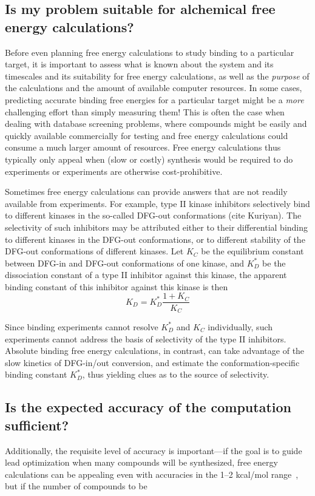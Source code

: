 \documentclass[9pt,bestpractices]{livecoms}
\begin{document}
\subsection*{Is my problem suitable for alchemical free energy calculations?}
Before even planning free energy calculations to study binding to a
particular target, it is important to assess what is known about the
system and its timescales and its suitability for free energy
calculations, as well as the \emph{purpose} of the calculations and
the amount of available computer resources. In some cases, predicting
accurate binding free energies for a particular target might be a
\emph{more} challenging effort than simply measuring them! This is
often the case when dealing with database screening problems, where
compounds might be easily and quickly available commercially for
testing and free energy calculations could consume a much larger
amount of resources. Free energy calculations thus typically only
appeal when (slow or costly) synthesis would be required to do
experiments or experiments are otherwise cost-prohibitive.

Sometimes free energy calculations can provide answers that are not
readily available from experiments.  For example, type II kinase
inhibitors selectively bind to different kinases in the so-called
DFG-out conformations (cite Kuriyan).  The selectivity of such
inhibitors may be attributed either to their differential binding to
different kinases in the DFG-out conformations, or to different
stability of the DFG-out conformations of different kinases.  Let
$K_C$ be the equilibrium constant between DFG-in and DFG-out
conformations of one kinase, and $K_D^\ast$ be the dissociation
constant of a type II inhibitor against this kinase, the apparent
binding constant of this inhibitor against this kinase is then
\begin{equation}
  K_D = K_D^\ast \frac{1 + K_C}{K_C}
  \label{eqn:conformational-binding}
\end{equation}

Since binding experiments cannot resolve $K_D^\ast$ and $K_C$ individually, such experiments cannot address the basis of selectivity of the type II inhibitors.  Absolute binding free energy calculations, in contrast, can take advantage of the slow kinetics of DFG-in/out conversion, and estimate the conformation-specific binding constant $K_D^\ast$, thus yielding clues as to the source of selectivity.

\subsection*{Is the expected accuracy of the computation sufficient?}
Additionally, the requisite level of accuracy is important---if the
goal is to guide lead optimization when many compounds will be
synthesized, free energy calculations can be appealing even with
accuracies in the 1--2 kcal/mol range~\cite{mobley2012perspective}, but if the number of compounds to be
\end{document}
